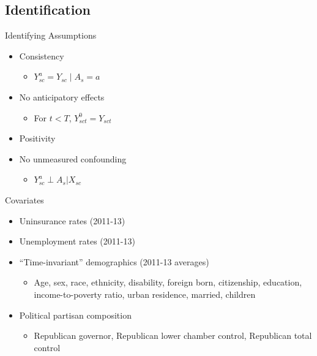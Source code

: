 \documentclass[hyperref={pdfpagelabels=false}]{beamer}
\begin{document}
\subsection{Identification}

\begin{frame}{Identifying Assumptions}

\begin{itemize}
    \item Consistency \bigskip
    \begin{itemize}
        \item $Y_{sc}^a = Y_{sc} \mid A_s = a$ \bigskip
    \end{itemize}
    \item No anticipatory effects \bigskip
    \begin{itemize}
        \item For $t < T$, $Y_{sct}^0 = Y_{sct}$ \bigskip
    \end{itemize}
    \item Positivity \bigskip
    \item No unmeasured confounding \bigskip
    \begin{itemize}
        \item $Y^a_{sc} \perp A_s | X_{sc}$ \bigskip 
    \end{itemize}
\end{itemize}

\end{frame}

\begin{frame}{Covariates}
\begin{itemize}
    \item Uninsurance rates (2011-13) \bigskip
    \item Unemployment rates (2011-13) \bigskip
    \item ``Time-invariant'' demographics (2011-13 averages) \bigskip
    \begin{itemize}
        \item Age, sex, race, ethnicity, disability, foreign born, citizenship, education, income-to-poverty ratio, urban residence, married, children \bigskip
    \end{itemize}
    \item Political partisan composition \bigskip
    \begin{itemize}
        \item Republican governor, Republican lower chamber control, Republican total control
    \end{itemize}
\end{itemize}
\end{frame}
\end{document}
